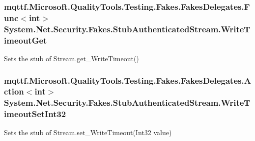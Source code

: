 \hypertarget{class_system_1_1_net_1_1_security_1_1_fakes_1_1_stub_authenticated_stream_a3575c1ec04061d2f66d6e061b19f73ba}{
\subsubsection[{Write\-Timeout\-Get}]{\setlength{\rightskip}{0pt plus 5cm}mqttf.\-Microsoft.\-Quality\-Tools.\-Testing.\-Fakes.\-Fakes\-Delegates.\-Func$<$int$>$ System.\-Net.\-Security.\-Fakes.\-Stub\-Authenticated\-Stream.\-Write\-Timeout\-Get}}\label{class_system_1_1_net_1_1_security_1_1_fakes_1_1_stub_authenticated_stream_a3575c1ec04061d2f66d6e061b19f73ba}


Sets the stub of Stream.\-get\-\_\-\-Write\-Timeout()

\hypertarget{class_system_1_1_net_1_1_security_1_1_fakes_1_1_stub_authenticated_stream_a5193988f395a508e2dffb60b6954a07f}{
\subsubsection[{Write\-Timeout\-Set\-Int32}]{\setlength{\rightskip}{0pt plus 5cm}mqttf.\-Microsoft.\-Quality\-Tools.\-Testing.\-Fakes.\-Fakes\-Delegates.\-Action$<$int$>$ System.\-Net.\-Security.\-Fakes.\-Stub\-Authenticated\-Stream.\-Write\-Timeout\-Set\-Int32}}\label{class_system_1_1_net_1_1_security_1_1_fakes_1_1_stub_authenticated_stream_a5193988f395a508e2dffb60b6954a07f}


Sets the stub of Stream.\-set\-\_\-\-Write\-Timeout(\-Int32 value)




